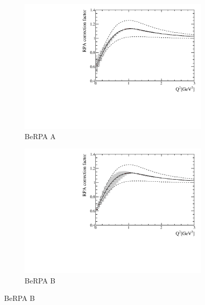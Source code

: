 \begin{figure}[h]
	\centering
	\begin{subfigure}[t]{0.42\textwidth}
		\includegraphics[width=\textwidth, trim={0mm 0mm 0mm 0mm}, clip,page=1]{figures/niwg/erpa_20percentA_throws}
		\caption{BeRPA A}
	\end{subfigure}
	\begin{subfigure}[t]{0.42\textwidth}
		\includegraphics[width=\textwidth, trim={0mm 0mm 0mm 0mm}, clip,page=1]{figures/niwg/erpa_20percentB_throws}
		\caption{BeRPA B}
	\end{subfigure}


\end{figure}
